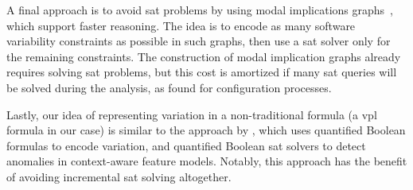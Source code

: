 A final approach is to avoid \ac{sat} problems by using modal implications
graphs~\citep{KTS+:ICSE18}, which support faster reasoning. The idea is to
encode as many software variability constraints as possible in such graphs,
then use a \ac{sat} solver only for the remaining constraints.
%
The construction of modal implication graphs already requires solving \ac{sat}
problems, but this cost is amortized if many \ac{sat} queries will be solved
during the analysis, as \citet{KTS+:ICSE18} found for configuration processes.

Lastly, our idea of representing variation in a non-traditional formula (a
\ac{vpl} formula in our case) is similar to the approach by
\cite{10.1145/3442391.3442405}, which uses quantified Boolean formulas to encode
variation, and quantified Boolean \ac{sat} solvers to detect anomalies in
context-aware feature models. Notably, this approach has the benefit of avoiding
incremental \ac{sat} solving altogether.



